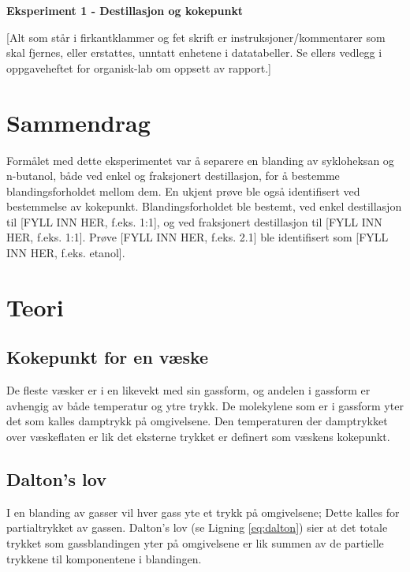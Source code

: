\begin{center} %
\LARGE{\textbf{Eksperiment 1 - Destillasjon og kokepunkt}}
\end{center}
[Alt som står i firkantklammer og fet skrift er instruksjoner/kommentarer som skal fjernes, eller erstattes, unntatt enhetene i datatabeller. Se ellers vedlegg i oppgaveheftet for organisk-lab om oppsett av rapport.]
\section*{Sammendrag}
Formålet med dette eksperimentet var å separere en blanding av sykloheksan og n-butanol, både ved enkel og fraksjonert destillasjon, for å bestemme blandingsforholdet mellom dem. En ukjent prøve ble også identifisert ved bestemmelse av kokepunkt. Blandingsforholdet ble bestemt, ved enkel destillasjon til [FYLL INN HER, f.eks. 1:1], og ved fraksjonert destillasjon til [FYLL INN HER, f.eks. 1:1]. Prøve [FYLL INN HER, f.eks. 2.1] ble identifisert som [FYLL INN HER, f.eks. etanol].




\section{Teori}

\subsection{Kokepunkt for en væske}

De fleste væsker er i en likevekt med sin gassform, og andelen i gassform er avhengig av både temperatur og ytre trykk.\cite{raymond2013general2nd} De molekylene som er i gassform yter det som kalles damptrykk på omgivelsene. Den temperaturen der damptrykket over væskeflaten er lik det eksterne trykket er definert som væskens kokepunkt. 

\subsection{Dalton's lov}

I en blanding av gasser vil hver gass yte et trykk på omgivelsene; Dette kalles for partialtrykket av gassen. Dalton’s lov (se Ligning \ref{eq:dalton}) sier at det totale trykket som gassblandingen yter på omgivelsene er lik summen av de partielle trykkene til komponentene i blandingen.\cite{harwood1999experimental}

